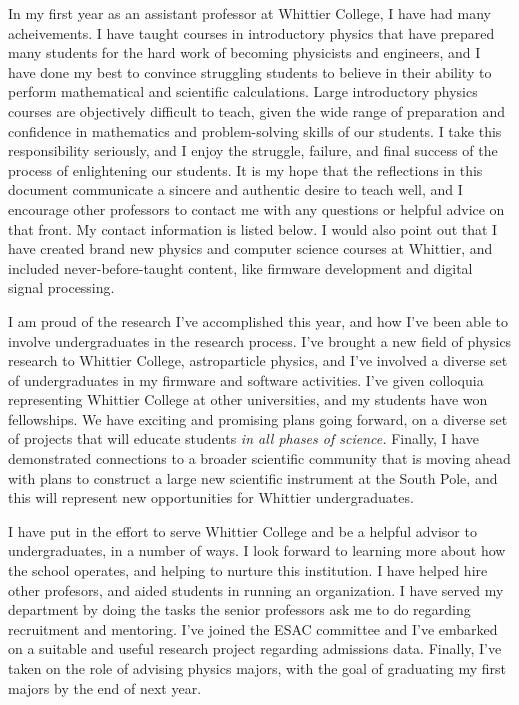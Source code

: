 \documentclass[../main.tex]{subfiles}
\begin{document}
In my first year as an assistant professor at Whittier College, I have had many acheivements.  I have taught courses in introductory physics that have prepared many students for the hard work of becoming physicists and engineers, and I have done my best to convince struggling students to believe in their ability to perform mathematical and scientific calculations.  Large introductory physics courses are objectively difficult to teach, given the wide range of preparation and confidence in mathematics and problem-solving skills of our students.  I take this responsibility seriously, and I enjoy the struggle, failure, and final success of the process of enlightening our students.  It is my hope that the reflections in this document communicate a sincere and authentic desire to teach well, and I encourage other professors to contact me with any questions or helpful advice on that front.  My contact information is listed below.  I would also point out that I have created brand new physics and computer science courses at Whittier, and included never-before-taught content, like firmware development and digital signal processing.  \\ \hspace{0.1cm}

I am proud of the research I've accomplished this year, and how I've been able to involve undergraduates in the research process.  I've brought a new field of physics research to Whittier College, astroparticle physics, and I've involved a diverse set of undergraduates in my firmware and software activities.  I've given colloquia representing Whittier College at other universities, and my students have won fellowships.  We have exciting and promising plans going forward, on a diverse set of projects that will educate students \textit{in all phases of science.}  Finally, I have demonstrated connections to a broader scientific community that is moving ahead with plans to construct a large new scientific instrument at the South Pole, and this will represent new opportunities for Whittier undergraduates. \\ \hspace{0.1cm}

I have put in the effort to serve Whittier College and be a helpful advisor to undergraduates, in a number of ways.  I look forward to learning more about how the school operates, and helping to nurture this institution.  I have helped hire other profesors, and aided students in running an organization.  I have served my department by doing the tasks the senior professors ask me to do regarding recruitment and mentoring.  I've joined the ESAC committee and I've embarked on a suitable and useful research project regarding admissions data.  Finally, I've taken on the role of advising physics majors, with the goal of graduating my first majors by the end of next year. \\ \hspace{0.1cm}
\end{document}
